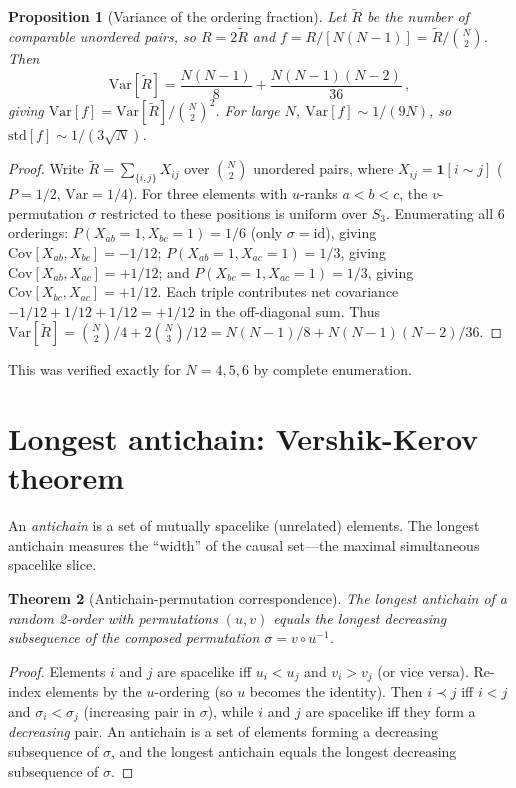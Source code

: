 \documentclass[aps,prd,twocolumn,superscriptaddress,nofootinbib]{revtex4-2}
\newtheorem{theorem}{Theorem}
\newtheorem{proposition}[theorem]{Proposition}
\begin{document}
\begin{proposition}[Variance of the ordering fraction]
\label{prop:variance}
Let $\tilde{R}$ be the number of comparable unordered pairs, so $R = 2\tilde{R}$ and $f = R/[N(N-1)] = \tilde{R}/\binom{N}{2}$. Then
\begin{equation}
\mathrm{Var}[\tilde{R}] = \frac{N(N-1)}{8} + \frac{N(N-1)(N-2)}{36}\,,
\end{equation}
giving $\mathrm{Var}[f] = \mathrm{Var}[\tilde{R}]/\binom{N}{2}^2$. For large $N$, $\mathrm{Var}[f] \sim 1/(9N)$, so $\mathrm{std}[f] \sim 1/(3\sqrt{N})$.
\end{proposition}

\begin{proof}
Write $\tilde{R} = \sum_{\{i,j\}} X_{ij}$ over $\binom{N}{2}$ unordered pairs, where $X_{ij} = \mathbf{1}[i \sim j]$ ($P = 1/2$, $\mathrm{Var} = 1/4$). For three elements with $u$-ranks $a < b < c$, the $v$-permutation $\sigma$ restricted to these positions is uniform over $S_3$. Enumerating all 6 orderings: $P(X_{ab}=1, X_{bc}=1) = 1/6$ (only $\sigma = \mathrm{id}$), giving $\mathrm{Cov}[X_{ab},X_{bc}] = -1/12$; $P(X_{ab}=1, X_{ac}=1) = 1/3$, giving $\mathrm{Cov}[X_{ab},X_{ac}] = +1/12$; and $P(X_{bc}=1, X_{ac}=1) = 1/3$, giving $\mathrm{Cov}[X_{bc},X_{ac}] = +1/12$. Each triple contributes net covariance $-1/12 + 1/12 + 1/12 = +1/12$ in the off-diagonal sum. Thus $\mathrm{Var}[\tilde{R}] = \binom{N}{2}/4 + 2\binom{N}{3}/12 = N(N-1)/8 + N(N-1)(N-2)/36$.
\end{proof}

This was verified exactly for $N = 4, 5, 6$ by complete enumeration.

\section{Longest antichain: Vershik-Kerov theorem}

An \emph{antichain} is a set of mutually spacelike (unrelated) elements. The longest antichain measures the ``width'' of the causal set---the maximal simultaneous spacelike slice.

\begin{theorem}[Antichain-permutation correspondence]
\label{thm:antichain}
The longest antichain of a random 2-order with permutations $(u, v)$ equals the longest \emph{decreasing} subsequence of the composed permutation $\sigma = v \circ u^{-1}$.
\end{theorem}

\begin{proof}
Elements $i$ and $j$ are spacelike iff $u_i < u_j$ and $v_i > v_j$ (or vice versa). Re-index elements by the $u$-ordering (so $u$ becomes the identity). Then $i \prec j$ iff $i < j$ and $\sigma_i < \sigma_j$ (increasing pair in $\sigma$), while $i$ and $j$ are spacelike iff they form a \emph{decreasing} pair. An antichain is a set of elements forming a decreasing subsequence of $\sigma$, and the longest antichain equals the longest decreasing subsequence of $\sigma$.
\end{proof}
\end{document}
